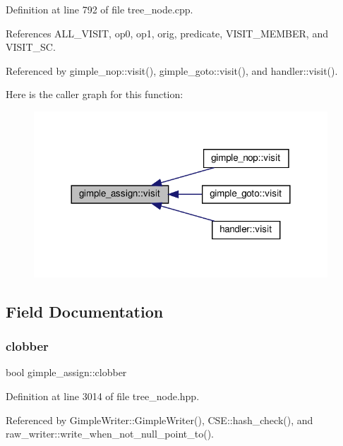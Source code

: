 Definition at line 792 of file tree\+\_\+node.\+cpp.



References A\+L\+L\+\_\+\+V\+I\+S\+IT, op0, op1, orig, predicate, V\+I\+S\+I\+T\+\_\+\+M\+E\+M\+B\+ER, and V\+I\+S\+I\+T\+\_\+\+SC.



Referenced by gimple\+\_\+nop\+::visit(), gimple\+\_\+goto\+::visit(), and handler\+::visit().

Here is the caller graph for this function\+:
\nopagebreak
\begin{figure}[H]
\begin{center}
\leavevmode
\includegraphics[width=312pt]{df/d3b/structgimple__assign_afc25fa9b669662e4f64f09c62284dec2_icgraph}
\end{center}
\end{figure}


\subsection{Field Documentation}
\mbox{\label{structgimple__assign_a6e39adec1ec67b7ac37d0086d7c5f3d4}} 
\subsubsection{\texorpdfstring{clobber}{clobber}}
{\footnotesize\ttfamily bool gimple\+\_\+assign\+::clobber}



Definition at line 3014 of file tree\+\_\+node.\+hpp.



Referenced by Gimple\+Writer\+::\+Gimple\+Writer(), C\+S\+E\+::hash\+\_\+check(), and raw\+\_\+writer\+::write\+\_\+when\+\_\+not\+\_\+null\+\_\+point\+\_\+to().

